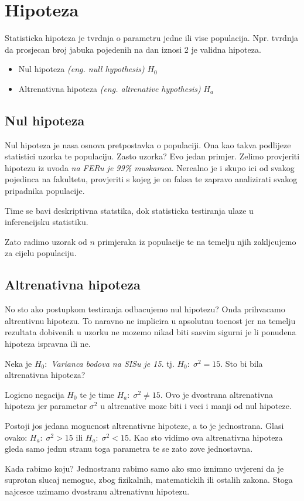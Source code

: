 \chapter{Hipoteza}

Statisticka hipoteza je tvrdnja o parametru jedne ili vise populacija.\cite{matstat} Npr. tvrdnja da prosjecan broj jabuka pojedenih na dan iznosi 2 je validna hipoteza.

\begin{itemize}
	\item Nul hipoteza \textit{(eng. null hypothesis)} $H_0$
	\item Altrenativna hipoteza \textit{(eng. altrenative hypothesis)} $H_a$
\end{itemize}

\section{Nul hipoteza}
Nul hipoteza je nasa osnova pretpostavka o populaciji. Ona kao takva podlijeze statistici uzorka te populaciju. Zasto uzorka? Evo jedan primjer. Zelimo provjeriti hipotezu iz uvoda \emph{na FERu je 99\% muskaraca}. Nerealno je i skupo ici od svakog pojedinca na fakultetu, provjeriti s kojeg je on faksa te zapravo analizirati svakog pripadnika populacije. 

Time se bavi deskriptivna statstika, dok statisticka testiranja ulaze u inferencijsku statistiku. 

Zato radimo uzorak od $n$ primjeraka iz populacije te na temelju njih zakljcujemo za cijelu populaciju.

\section{Altrenativna hipoteza}

No sto ako postupkom testiranja odbacujemo nul hipotezu? Onda prihvacamo altrentivnu hipotezu. To naravno ne implicira u apsolutnu tocnost jer na temelju rezultata dobivenih u uzorku ne mozemo nikad biti sasvim sigurni je li ponudena
hipoteza ispravna ili ne. \cite{vis3}

Neka je $H_0:$ \emph{Varianca bodova na SISu je 15}. tj. $H_0:\; \sigma^2 = 15$. Sto bi bila altrenativna hipoteza? 

Logicno negacija $H_0$ te je time $H_a:\; \sigma^2 \ne 15$. Ovo je dvostrana altrenativna hipoteza jer parametar $\sigma^2$ u altrenative moze biti i veci i manji od nul hipoteze. 

Postoji jos jedana mogucnost altrenativne hipoteze, a to je jednostrana. Glasi ovako: $H_a:\; \sigma^2 > 15$ ili $H_a:\; \sigma^2 < 15$. Kao sto vidimo ova altrenativna hipoteza gleda samo jednu stranu toga parametra te se zato zove jednostavna. \cite{engstat}

Kada rabimo koju? Jednostranu rabimo samo ako smo iznimno uvjereni da je suprotan slucaj nemoguc, zbog fizikalnih, matematickih ili ostalih zakona. Stoga najcesce uzimamo dvostranu altrenativnu hipotezu.